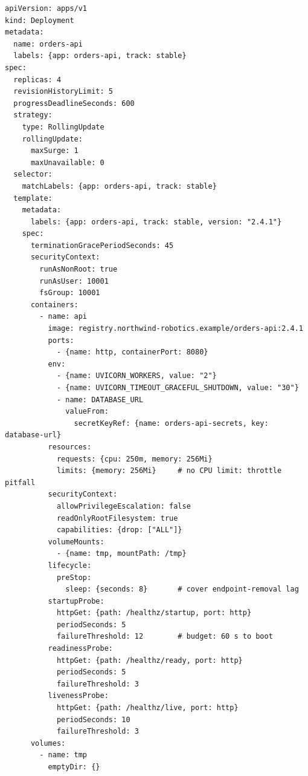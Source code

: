 \begin{verbatim}
apiVersion: apps/v1
kind: Deployment
metadata:
  name: orders-api
  labels: {app: orders-api, track: stable}
spec:
  replicas: 4
  revisionHistoryLimit: 5
  progressDeadlineSeconds: 600
  strategy:
    type: RollingUpdate
    rollingUpdate:
      maxSurge: 1
      maxUnavailable: 0
  selector:
    matchLabels: {app: orders-api, track: stable}
  template:
    metadata:
      labels: {app: orders-api, track: stable, version: "2.4.1"}
    spec:
      terminationGracePeriodSeconds: 45
      securityContext:
        runAsNonRoot: true
        runAsUser: 10001
        fsGroup: 10001
      containers:
        - name: api
          image: registry.northwind-robotics.example/orders-api:2.4.1
          ports:
            - {name: http, containerPort: 8080}
          env:
            - {name: UVICORN_WORKERS, value: "2"}
            - {name: UVICORN_TIMEOUT_GRACEFUL_SHUTDOWN, value: "30"}
            - name: DATABASE_URL
              valueFrom:
                secretKeyRef: {name: orders-api-secrets, key: database-url}
          resources:
            requests: {cpu: 250m, memory: 256Mi}
            limits: {memory: 256Mi}     # no CPU limit: throttle pitfall
          securityContext:
            allowPrivilegeEscalation: false
            readOnlyRootFilesystem: true
            capabilities: {drop: ["ALL"]}
          volumeMounts:
            - {name: tmp, mountPath: /tmp}
          lifecycle:
            preStop:
              sleep: {seconds: 8}       # cover endpoint-removal lag
          startupProbe:
            httpGet: {path: /healthz/startup, port: http}
            periodSeconds: 5
            failureThreshold: 12        # budget: 60 s to boot
          readinessProbe:
            httpGet: {path: /healthz/ready, port: http}
            periodSeconds: 5
            failureThreshold: 3
          livenessProbe:
            httpGet: {path: /healthz/live, port: http}
            periodSeconds: 10
            failureThreshold: 3
      volumes:
        - name: tmp
          emptyDir: {}
\end{verbatim}

